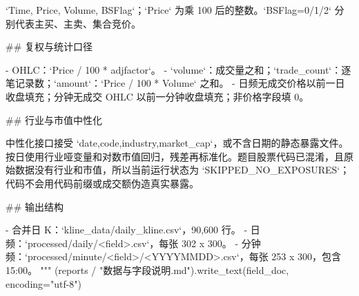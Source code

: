 \documentclass[UTF8,a4paper,fontset=fandol]{ctexart}
\begin{document}
\begin{ProjectCode}
{`Time, Price, Volume, BSFlag`；`Price` 为乘 100 后的整数。`BSFlag=0/1/2` 分别代表主买、主卖、集合竞价。

## 复权与统计口径

- OHLC：`Price / 100 * adjfactor`。
- `volume`：成交量之和；`trade_count`：逐笔记录数；`amount`：`Price / 100 * Volume` 之和。
- 日频无成交价格以前一日收盘填充；分钟无成交 OHLC 以前一分钟收盘填充；非价格字段填 0。

## 行业与市值中性化

中性化接口接受 `date,code,industry,market_cap`，或不含日期的静态暴露文件。按日使用行业哑变量和对数市值回归，残差再标准化。题目股票代码已混淆，且原始数据没有行业和市值，所以当前运行状态为 `SKIPPED_NO_EXPOSURES`；代码不会用代码前缀或成交额伪造真实暴露。

## 输出结构

- 合并日 K：`kline_data/daily_kline.csv`，90,600 行。
- 日频：`processed/daily/<field>.csv`，每张 302 x 300。
- 分钟频：`processed/minute/<field>/<YYYYMMDD>.csv`，每张 253 x 300，包含 15:00。
"""
    (reports / "数据与字段说明.md").write_text(field_doc, encoding="utf-8")

}
\end{ProjectCode}
\end{document}
